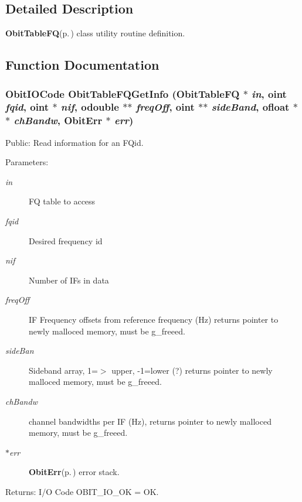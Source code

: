 \subsection{Detailed Description}
{\bf Obit\-Table\-FQ}{\rm (p.\,\pageref{structObitTableFQ})} class utility routine definition. 



\subsection{Function Documentation}
\subsubsection{\setlength{\rightskip}{0pt plus 5cm}Obit\-IOCode Obit\-Table\-FQGet\-Info ({\bf Obit\-Table\-FQ} $\ast$ {\em in}, {\bf oint} {\em fqid}, {\bf oint} $\ast$ {\em nif}, {\bf odouble} $\ast$$\ast$ {\em freq\-Off}, {\bf oint} $\ast$$\ast$ {\em side\-Band}, {\bf ofloat} $\ast$$\ast$ {\em ch\-Bandw}, {\bf Obit\-Err} $\ast$ {\em err})}\label{ObitTableFQUtil_8h_a0}


Public: Read information for an FQid. 

\begin{Desc}
\item[Parameters:]
\begin{description}
\item[{\em in}]FQ table to access \item[{\em fqid}]Desired frequency id \item[{\em nif}]Number of IFs in data \item[{\em freq\-Off}]IF Frequency offsets from reference frequency (Hz) returns pointer to newly malloced memory, must be g\_\-freeed. \item[{\em side\-Ban}]Sideband array, 1=$>$ upper, -1=lower (?) returns pointer to newly malloced memory, must be g\_\-freeed. \item[{\em ch\-Bandw}]channel bandwidths per IF (Hz), returns pointer to newly malloced memory, must be g\_\-freeed. \item[{\em $\ast$err}]{\bf Obit\-Err}{\rm (p.\,\pageref{structObitErr})} error stack. \end{description}
\end{Desc}
\begin{Desc}
\item[Returns:]I/O Code OBIT\_\-IO\_\-OK = OK. \end{Desc}
